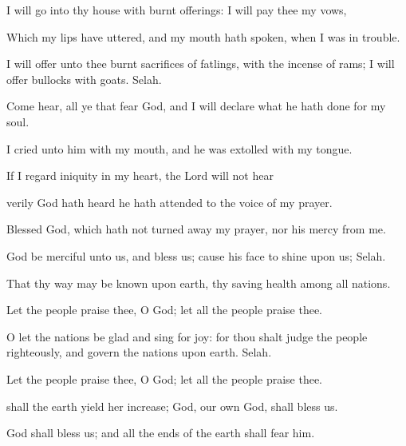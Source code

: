{\Q {}I will
go into thy
house with burnt
offerings: I will
pay thee my
vows,


\par }{\Q {}Which my
lips have
uttered, and my
mouth hath
spoken, when I was in
trouble.


\par }{\Q {}I will
offer unto thee burnt
sacrifices of
fatlings, with the
incense of
rams; I will
offer
bullocks with
goats.
Selah.


\par }{\Q {}Come
{}
hear, all ye that
fear
God, and I will
declare what he hath
done for my
soul.


\par }{\Q {}I
cried unto him with my
mouth, and he was
extolled
with my
tongue.


\par }{\Q {}If I
regard
iniquity in my
heart, the
Lord will not
hear
{}


\par }{\Q {}
verily
God hath
heard
{} he hath
attended to the
voice of my
prayer.


\par }{\Q {}Blessed
{}
God, which hath not turned
away my
prayer, nor his
mercy from me.




\par }
{\Q {}God be
merciful unto us, and
bless us;
{} cause his
face to
shine upon us;
Selah.


\par }{\Q {}That thy
way may be
known upon
earth, thy saving
health among all
nations.


\par }{\Q {}Let the
people
praise thee, O
God; let all the
people
praise thee.


\par }{\Q {}O let the
nations be
glad and sing for
joy: for thou shalt
judge the
people
righteously, and
govern the
nations upon
earth.
Selah.


\par }{\Q {}Let the
people
praise thee, O
God; let all the
people
praise thee.


\par }{\Q {} shall the
earth
yield her
increase;
{}
God,
{} our own
God, shall
bless us.


\par }{\Q {}God shall
bless us; and all the
ends of the
earth shall
fear him.




\par }

